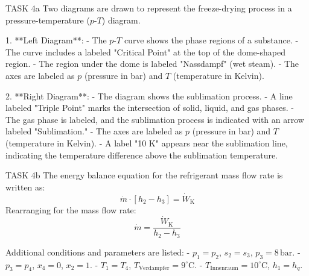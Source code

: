 TASK 4a  
Two diagrams are drawn to represent the freeze-drying process in a pressure-temperature (\(p\)-\(T\)) diagram.  

1. **Left Diagram**:  
   - The \(p\)-\(T\) curve shows the phase regions of a substance.  
   - The curve includes a labeled "Critical Point" at the top of the dome-shaped region.  
   - The region under the dome is labeled "Nassdampf" (wet steam).  
   - The axes are labeled as \(p\) (pressure in bar) and \(T\) (temperature in Kelvin).  

2. **Right Diagram**:  
   - The diagram shows the sublimation process.  
   - A line labeled "Triple Point" marks the intersection of solid, liquid, and gas phases.  
   - The gas phase is labeled, and the sublimation process is indicated with an arrow labeled "Sublimation."  
   - The axes are labeled as \(p\) (pressure in bar) and \(T\) (temperature in Kelvin).  
   - A label "10 K" appears near the sublimation line, indicating the temperature difference above the sublimation temperature.  

TASK 4b  
The energy balance equation for the refrigerant mass flow rate is written as:  
\[
\dot{m} \cdot [h_2 - h_3] = \dot{W}_\text{K}
\]  
Rearranging for the mass flow rate:  
\[
\dot{m} = \frac{\dot{W}_\text{K}}{h_2 - h_3}
\]  

Additional conditions and parameters are listed:  
- \(p_1 = p_2\), \(s_2 = s_3\), \(p_3 = 8 \, \text{bar}\).  
- \(p_3 = p_4\), \(x_4 = 0\), \(x_2 = 1\).  
- \(T_1 = T_4\), \(T_\text{Verdampfer} = 9^\circ\text{C}\).  
- \(T_\text{Innenraum} = 10^\circ\text{C}\), \(h_1 = h_q\).  